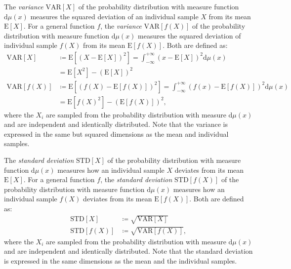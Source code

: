 \documentclass[10pt,a4paper]{article}
\numberwithin{equation}{section}
\begin{document}
The \textit{variance} $\mathrm{VAR}\left[X\right]$ of the probability distribution with measure function $\mathrm{d}\mu\left(x\right)$ measures the squared deviation of an individual sample $X$ from its mean $\mathrm{E}\left[X\right]$. For a general function $f$, the \textit{variance} $\mathrm{VAR}\left[f\left(X\right)\right]$ of the probability distribution with measure function $\mathrm{d}\mu\left(x\right)$ measures the squared deviation of individual sample $f\left(X\right)$ from its mean $\mathrm{E}\left[f\left(X\right)\right]$. Both are defined as:
\begin{align}
\label{equation:VAR}\mathrm{VAR}\left[X\right] 					&\coloneqq  \mathrm{E}\left[{\left(X-\mathrm{E}\left[X\right]\right)}^{2}\right] = \int_{-\infty}^{+\infty} {\left(x-\mathrm{E}\left[X\right]\right)}^{2} \mathrm{d}\mu\left(x\right) \\
&= \mathrm{E}\left[{X}^{2}\right] - {\left(\mathrm{E}\left[X\right]\right)}^{2} \\
\label{equation:VARf}\mathrm{VAR}\left[f\left(X\right)\right] 	&\coloneqq  \mathrm{E}\left[{\left(f\left(X\right)-\mathrm{E}\left[f\left(X\right)\right]\right)}^{2}\right] = \int_{-\infty}^{+\infty} {\left(f\left(x\right)-\mathrm{E}\left[f\left(X\right)\right]\right)}^{2} \mathrm{d}\mu\left(x\right) \\
&= \mathrm{E}\left[{f\left(X\right)}^{2}\right] - {\left(\mathrm{E}\left[f\left(X\right)\right]\right)}^{2},
\end{align}
where the $X_{i}$ are sampled from the probability distribution with measure $\mathrm{d}\mu\left(x\right)$ and are independent and identically distributed. Note that the variance is expressed in the same but squared dimensions as the mean and individual samples.

The \textit{standard deviation} $\mathrm{STD}\left[X\right]$ of the probability distribution with measure function $\mathrm{d}\mu\left(x\right)$ measures how an individual sample $X$ deviates from its mean $\mathrm{E}\left[X\right]$. For a general function $f$, the \textit{standard deviation} $\mathrm{STD}\left[f\left(X\right)\right]$ of the probability distribution with measure function $\mathrm{d}\mu\left(x\right)$ measures how an individual sample $f\left(X\right)$ deviates from its mean $\mathrm{E}\left[f\left(X\right)\right]$. Both are defined as:
\begin{align}
\label{equation:STD}\mathrm{STD}\left[X\right] 					&\coloneqq \sqrt{\mathrm{VAR}\left[X\right]} \\
\label{equation:STDf}\mathrm{STD}\left[f\left(X\right)\right] 	&\coloneqq \sqrt{\mathrm{VAR}\left[f\left(X\right)\right]},
\end{align}
where the $X_{i}$ are sampled from the probability distribution with measure $\mathrm{d}\mu\left(x\right)$ and are independent and identically distributed. Note that the standard deviation is expressed in the same dimensions as the mean and the individual samples.
\end{document}
